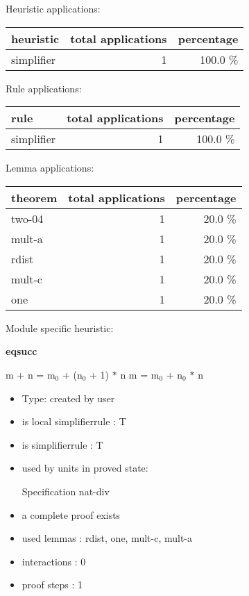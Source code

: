 \documentclass[a4paper]{article}
\begin{document}
\medskip


Heuristic applications:

\begin{supertabular}{l|r|r}
heuristic	& total applications & percentage \\ \hline
simplifier & 1 & 100.0 \% \\

\end{supertabular}

Rule applications:

\begin{supertabular}{l|r|r}
rule	        & total applications & percentage \\ \hline
simplifier & 1 & 100.0 \% \\

\end{supertabular}

Lemma applications:

\begin{supertabular}{l|r|r}
theorem	        & total applications & percentage \\ \hline
two-04 & 1 & 20.0 \% \\
mult-a & 1 & 20.0 \% \\
rdist & 1 & 20.0 \% \\
mult-c & 1 & 20.0 \% \\
one & 1 & 20.0 \% \\

\end{supertabular}

Module specific heuristic:

\pagebreak

{\LARGE\bf eqsucc}\label{lemma-eqsucc}

\medskip

 \Fol m + n = $\mbox{m}_{0}$ + ($\mbox{n}_{0}$ + 1) $*$ n \Equiv m = $\mbox{m}_{0}$ + $\mbox{n}_{0}$ $*$ n

\begin{itemize}

\item Type: created by user

\item is local simplifierrule : T
\item is simplifierrule : T
\item used by units in proved state:

Specification nat-div
\item       a complete proof exists
\item       used lemmas  : rdist, one, mult-c, mult-a
\item       interactions : 0
\item       proof steps  : 1
\end{itemize}
\end{document}
